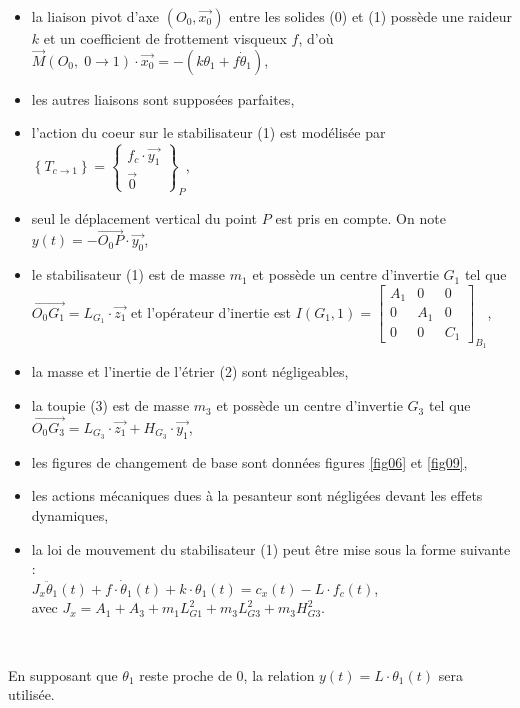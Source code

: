 \begin{itemize}
 \item la liaison pivot d'axe $(O_0,\overrightarrow{x_0})$ entre les solides (0) et (1) possède une raideur $k$ et un coefficient de frottement visqueux $f$, d'où $\overrightarrow{M}(O_0,\;0 \rightarrow 1)\cdot \overrightarrow{x_0}=-(k\theta_1+f\dot\theta_1)$,
 \item les autres liaisons sont supposées parfaites,
 \item l'action du coeur sur le stabilisateur (1) est modélisée par 
$\left \{T_{c \rightarrow 1}\right \}=\left \{
\begin{matrix}
 f_c \cdot \overrightarrow{y_1} \\ 
 \overrightarrow{0}
\end{matrix}
\right \}_{P}$,
 \item seul le déplacement vertical du point $P$ est pris en compte. On note $y(t)=-\overrightarrow{O_0P} \cdot \overrightarrow{y_0}$,
 \item le stabilisateur (1) est de masse $m_1$ et possède un centre d'invertie $G_1$ tel que $\overrightarrow{O_0G_1}=L_{G_1} \cdot \overrightarrow{z_1}$ et l'opérateur d'inertie est $I(G_1,1)=\left[\begin{array}{ccc} 
         A_1&0&0 \\ 0&A_1&0 \\ 0&0&C_1 
   \end{array}\right]_{B_1}$,
 \item la masse et l'inertie de l'étrier (2) sont négligeables,
 \item la toupie (3) est de masse $m_3$ et possède un centre d'invertie $G_3$ tel que $\overrightarrow{O_0G_3}=L_{G_3} \cdot \overrightarrow{z_1}+H_{G_3}\cdot \overrightarrow{y_1}$,
 \item les figures de changement de base sont données figures \ref{fig06} et \ref{fig09},
 \item les actions mécaniques dues à la pesanteur sont négligées devant les effets dynamiques,
 \item la loi de mouvement du stabilisateur (1) peut être mise sous la forme suivante : \\
$J_x\ddot\theta_1(t)+f\cdot \dot\theta_1(t)+k\cdot\theta_1(t)=c_x(t)-L\cdot f_c(t)$,\\ avec $J_x=A_1+A_3+m_1L^2_{G1}+m_3L^2_{G3}+m_3H^2_{G3}$.
\end{itemize}

~\

En supposant que $\theta_1$ reste proche de 0, la relation $y(t)=L\cdot \theta_1(t)$ sera utilisée.

